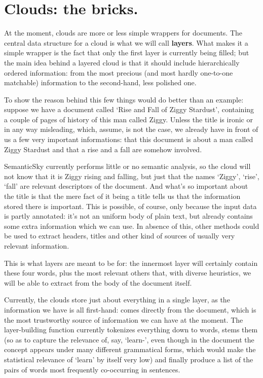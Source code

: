 \documentclass[11pt]{article}
\begin{document}
\section{Clouds: the bricks.}

At the moment, clouds are more or less simple wrappers for documents. The central data structure for a cloud is what we will call \textbf{layers}. What makes it a simple wrapper is the fact that only the first layer is currently being filled; but the main idea behind a layered cloud is that it should include hierarchically ordered information: from the most precious (and most hardly one-to-one matchable) information to the second-hand, less polished one.

To show the reason behind this few things would do better than an example: suppose we have a document called `Rise and Fall of Ziggy Stardust', containing a couple of pages of history of this man called Ziggy. Unless the title is ironic or in any way misleading, which, assume, is not the case, we already have in front of us a few very important informations: that this document is about a man called Ziggy Stardust and that a rise and a fall are somehow involved.

SemanticSky currently performs little or no semantic analysis, so the cloud will not know that it is Ziggy rising and falling, but just that the names `Ziggy', `rise', `fall' are relevant descriptors of the document. And what's so important about the title is that the mere fact of it being a title tells us that the information stored there is important. This is possible, of course, only because the input data is partly annotated: it's not an uniform body of plain text, but already contains some extra information which we can use. In absence of this, other methods could be used to extract headers, titles and other kind of sources of usually very relevant information.

This is what layers are meant to be for: the innermost layer will certainly contain these four words, plus the most relevant others that, with diverse heuristics, we will be able to extract from the body of the document itself.

Currently, the clouds store just about everything in a single layer, as the information we have is all first-hand: comes directly from the document, which is the most trustworthy source of information we can have at the moment. The layer-building function currently tokenizes everything down to words, stems them (so as to capture the relevance of, say, `learn-', even though in the document the concept appears under many different grammatical forms, which would make the statistical relevance of `learn' by itself very low) and finally produce a list of the pairs of words most frequently co-occurring in sentences.
\end{document}
